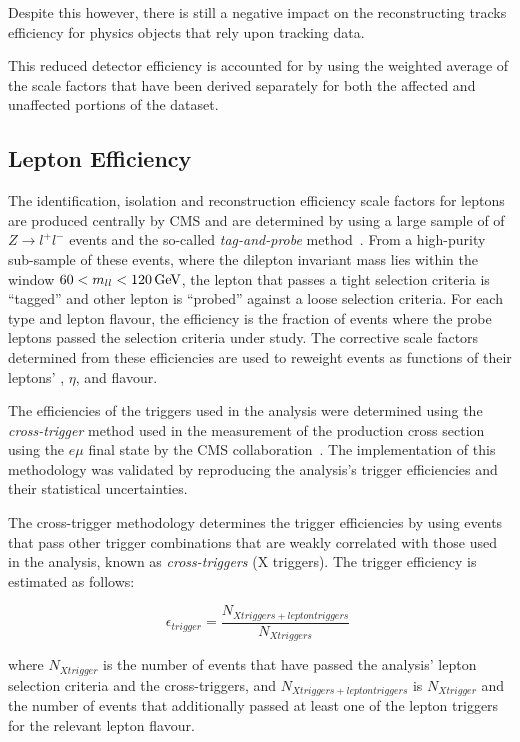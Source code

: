 Despite this however, there is still a negative impact on the reconstructing tracks efficiency for physics objects that rely upon tracking data.

This reduced detector efficiency is accounted for by using the weighted average of the scale factors that have been derived separately for both the affected and unaffected portions of the dataset.

\subsection{Lepton Efficiency}\label{subsec:leptonRecoSFs}
The identification, isolation and reconstruction efficiency scale factors for leptons are produced centrally by CMS and are determined by using a large sample of of $Z \rightarrow l^{+} l ^{-}$ events and the so-called \emph{tag-and-probe} method~\cite{CMS:2008rxa}.
From a high-purity sub-sample of these events, where the dilepton invariant mass lies within the window $60 < m_{ll} < 120 \,\text{Ge\hspace{-.08em}V}$, the lepton that passes a tight selection criteria is ``tagged'' and other lepton is ``probed'' against a loose selection criteria.
For each type and lepton flavour, the efficiency is the fraction of events where the probe leptons passed the selection criteria under study.
The corrective scale factors determined from these efficiencies are used to reweight events as functions of their leptons' \pt, $\eta$, and flavour.

The efficiencies of the triggers used in the analysis were determined using the \emph{cross-trigger} method used in the measurement of the \ttbar production cross section using the $e\mu$ final state by the CMS collaboration~\cite{Khachatryan:2016kzg}.
The implementation of this methodology was validated by reproducing the \ttbar analysis's trigger efficiencies and their statistical uncertainties.

The cross-trigger methodology determines the trigger efficiencies by using events that pass other trigger combinations that are weakly correlated with those used in the analysis, known as \emph{cross-triggers} (X triggers).
The trigger efficiency is estimated as follows:

\begin{equation}
\epsilon_{trigger} = \frac{N_{X triggers + lepton triggers}}{N_{X triggers}} \;
\end{equation}

where $N_{X trigger}$ is the number of events that have passed the analysis' lepton selection criteria and the cross-triggers, and $N_{X triggers + lepton triggers}$ is $N_{X trigger}$ and the number of events that additionally passed at least one of the lepton triggers for the relevant lepton flavour.

